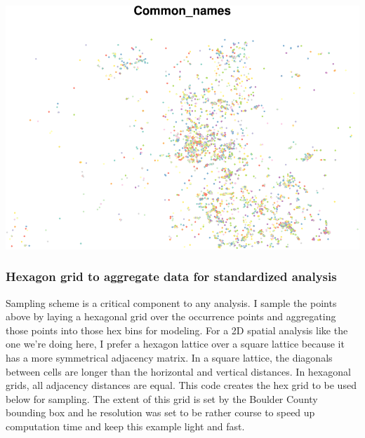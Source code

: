 \documentclass[
]{article}
\begin{document}
\includegraphics{Earth_Lab_application_files/figure-latex/unnamed-chunk-5-1.pdf}

\hypertarget{hexagon-grid-to-aggregate-data-for-standardized-analysis}{%
\subsubsection{Hexagon grid to aggregate data for standardized
analysis}\label{hexagon-grid-to-aggregate-data-for-standardized-analysis}}

Sampling scheme is a critical component to any analysis. I sample the
points above by laying a hexagonal grid over the occurrence points and
aggregating those points into those hex bins for modeling. For a 2D
spatial analysis like the one we're doing here, I prefer a hexagon
lattice over a square lattice because it has a more symmetrical
adjacency matrix. In a square lattice, the diagonals between cells are
longer than the horizontal and vertical distances. In hexagonal grids,
all adjacency distances are equal. This code creates the hex grid to be
used below for sampling. The extent of this grid is set by the Boulder
County bounding box and he resolution was set to be rather course to
speed up computation time and keep this example light and fast.
\end{document}
